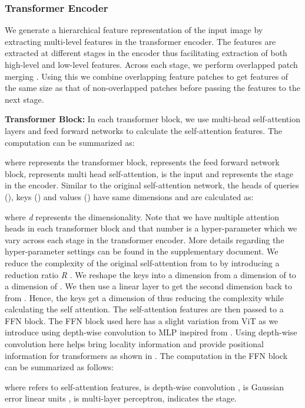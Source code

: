 \documentclass[10pt,twocolumn,letterpaper]{article}
\begin{document}
\subsubsection{Transformer Encoder}

We generate a hierarchical feature representation of the input image by extracting multi-level features in the transformer encoder. The features are extracted at different stages in the encoder thus facilitating extraction of both  high-level and low-level features. Across each stage, we perform overlapped patch merging \cite{xie2021segformer}. Using this we combine overlapping feature patches to get features of the same size as that of non-overlapped patches before passing the features to the next stage.  

\noindent \textbf{Transformer Block:} In each transformer block, we use multi-head self-attention layers and feed forward networks to calculate the self-attention features. The computation can be summarized as:

where  represents the transformer block,  represents the feed forward network block,  represents multi head self-attention,  is the input and  represents the stage in the encoder. Similar to the original self-attention network, the heads of queries (), keys () and values () have same dimensions and are calculated as:

where \textit{d} represents the dimensionality. Note that we have multiple attention heads in each transformer block and that number is a hyper-parameter which we  vary across each stage in the transformer encoder. More details regarding the hyper-parameter settings can be found in the supplementary document.  We reduce the complexity of the original self-attention from  to  by introducing a reduction ratio \textit{R} \cite{wang2021pyramid}. We reshape the keys into a dimension from a dimension of  to a dimension of . We then use a linear layer to get the second dimension back to  from . Hence, the keys get a dimension of  thus reducing the complexity while calculating the self attention. The self-attention features are then passed to a FFN block. 
The FFN block used here has a slight variation from ViT as we introduce using depth-wise convolution to MLP inspired from \cite{wu2021cvt,xie2021segformer, li2021localvit}. Using depth-wise convolution here helps bring locality information and provide positional information for transformers as shown in \cite{xie2021segformer}. The computation in the FFN block can be summarized as follows:

where  refers to self-attention features,  is depth-wise convolution \cite{chollet2017xception},  is Gaussian error linear units \cite{hendrycks2016gaussian},  is multi-layer perceptron,  indicates the stage.
\end{document}
